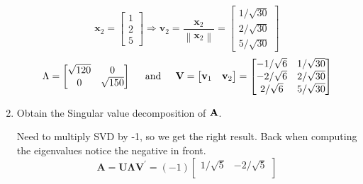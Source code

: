 \begin{enumerate}[label=(\alph*)]
            \[
                \mathbf{x}_2
                =
                \begin{bmatrix}
                    1 \\
                    2 \\
                    5
                \end{bmatrix}
                \Rightarrow
                \mathbf{v}_2
                =
                \frac{\mathbf{x}_2}{\left\|\mathbf{x}_2\right\|}
                =
                \begin{bmatrix}
                    1/\sqrt{30} \\
                    2/\sqrt{30} \\
                    5/\sqrt{30}
                \end{bmatrix}
            \]
            \[
                \Lambda
                =
                \begin{bmatrix}
                    \sqrt{120} & 0 \\
                    0 & \sqrt{150}
                \end{bmatrix}
                \hspace{0.2in}\text{and}\hspace{0.2in}
                \mathbf{V}
                =
                \begin{bmatrix}
                    \mathbf{v}_1 & \mathbf{v}_2
                \end{bmatrix}
                =
                \begin{bmatrix}
                    -1/\sqrt{6} & 1/\sqrt{30} \\
                    -2/\sqrt{6} & 2/\sqrt{30} \\
                    2/\sqrt{6} & 5/\sqrt{30}
                \end{bmatrix}
            \]
            \item Obtain the Singular value decomposition of $\bold{A}$.
            \newline
            \par
            Need to multiply SVD by -1, so we get the right result. Back when computing the eigenvalues notice the negative in front.
            \[
                \mathbf{A}
                =
                \mathbf{U}\mathbf{\Lambda}\mathbf{\mathbf{V}}^\prime
                =
                (-1)
                \begin{bmatrix}
                    1/\sqrt{5} & -2/\sqrt{5} \\

\end{bmatrix}\]
\end{enumerate}
